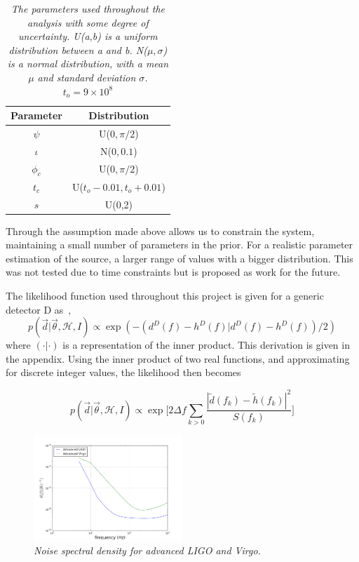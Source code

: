 \documentclass{jpconf}
\newcommand{\curlH}{\mathcal{H}}
\begin{document}
\begin{table}[H]
  \centering
  \begin{tabular}{|c|c|}
    \hline
    Parameter & Distribution \\
    \hline
    $\psi$   &  U($0,\pi/2$)\\
    $\iota$   & N($0,0.1$) \\
    $\phi_c$  & U($0,\pi/2$)\\
    $t_c$     & U($t_{o}-0.01, t_{o}+0.01$) \\
    $s$       & U(0,2) \\
    \hline
  \end{tabular}
  \label{tab:prior}
  \caption{\textit{The parameters used throughout the analysis with some degree of uncertainty. U(a,b) is a uniform distribution between a and b. N($\mu, \sigma$) is a normal distribution, with a mean $\mu$ and standard deviation $\sigma$. $t_{o} = 9\times10^{8}$}}
\end{table}  




Through the assumption made above allows us to constrain the system, maintaining a small number of parameters in the prior. For a realistic parameter estimation of the source, a larger range of values with a bigger distribution. This was not tested due to time constraints but is proposed as work for the future.   




The likelihood function used throughout this project is given for a generic detector D as~\cite{JVei}, 
\begin{equation}
  p(\vec{d} | \vec{\theta}, \curlH, I) \propto \exp(-(d^{D}(f) - h^{D}(f)|d^{D}(f) - h^{D}(f))/2)
\end{equation}
where $(\cdot |\cdot )$ is a representation of the inner product. This derivation is given in the appendix. Using the inner product of two real functions, and approximating for discrete integer values, the likelihood then becomes





\begin{equation}
  p(\vec{d} | \vec{\theta}, \curlH, I) \propto \exp\Bigg[ 2\Delta f\sum_{k>0}\frac{|\tilde{d}(f_{k}) - \tilde{h}(f_{k})|^{2}}{S(f_{k})} \Bigg]
\end{equation}

\begin{figure}
  \centering
  \includegraphics[width=0.5\textwidth]{PSD}
  \caption{\textit{Noise spectral density for advanced LIGO and Virgo.}}
  \label{fig:psd}
\end{figure}
\end{document}
